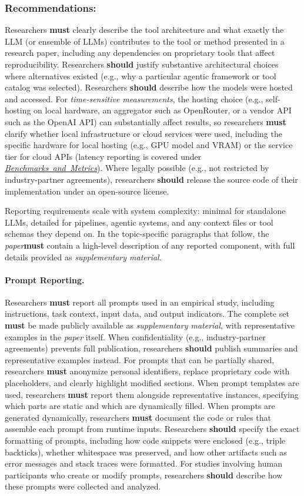 \documentclass[smallextended]{svjour3}
\newcommand{\must}{\textbf{must}\xspace}
\newcommand{\should}{\textbf{should}\xspace}
\newcommand{\paper}{\emph{paper}\xspace}
\newcommand{\supplementarymaterial}{\emph{supplementary material}\xspace}
\newcommand{\paper}{\emph{paper}\xspace}
\newcommand{\supplementarymaterial}{\emph{supplementary material}\xspace}
\newcommand{\benchmarksmetrics}{\hyperref[sec:use-suitable-baselines-benchmarks-and-metrics]{\mbox{\emph{Benchmarks and Metrics}}}\xspace}
\newcommand{\benchmarksmetrics}{\href{/guidelines/benchmarks-metrics/}{\emph{Benchmarks and Metrics}}\xspace}
\newcommand{\guidelinesubsubsection}[1]{\subsubsection{\bfseries #1:}}
\newcommand{\guidelineparagraph}[1]{\paragraph{#1.}}
\newcommand{\guidelinesubsubsection}[1]{\subsubsection{#1}}
\newcommand{\guidelineparagraph}[1]{\paragraph{#1}}
\begin{document}
\guidelinesubsubsection{Recommendations}

Researchers \must clearly describe the tool architecture and what exactly the LLM (or ensemble of LLMs) contributes to the tool or method presented in a research paper, including any dependencies on proprietary tools that affect reproducibility.
Researchers \should justify substantive architectural choices where alternatives existed (e.g., why a particular agentic framework or tool catalog was selected).
Researchers \should describe how the models were hosted and accessed. For \emph{time-sensitive measurements}, the hosting choice (e.g., self-hosting on local hardware, an aggregator such as OpenRouter, or a vendor API such as the OpenAI API) can substantially affect results, so researchers \must clarify whether local infrastructure or cloud services were used, including the specific hardware for local hosting (e.g., GPU model and VRAM) or the service tier for cloud APIs (latency reporting is covered under \benchmarksmetrics).
Where legally possible (e.g., not restricted by industry-partner agreements), researchers \should release the source code of their implementation under an open-source license.

Reporting requirements scale with system complexity: minimal for standalone LLMs, detailed for pipelines, agentic systems, and any context files or tool schemas they depend on. In the topic-specific paragraphs that follow, the \paper \must contain a high-level description of any reported component, with full details provided as \supplementarymaterial.

\guidelineparagraph{Prompt Reporting}
Researchers \must report all prompts used in an empirical study, including instructions, task context, input data, and output indicators.
The complete set \must be made publicly available as \supplementarymaterial, with representative examples in the \paper itself.
When confidentiality (e.g., industry-partner agreements) prevents full publication, researchers \should publish summaries and representative examples instead.
For prompts that can be partially shared, researchers \must anonymize personal identifiers, replace proprietary code with placeholders, and clearly highlight modified sections.
When prompt templates are used, researchers \must report them alongside representative instances, specifying which parts are static and which are dynamically filled.
When prompts are generated dynamically, researchers \must document the code or rules that assemble each prompt from runtime inputs.
Researchers \should specify the exact formatting of prompts, including how code snippets were enclosed (e.g., triple backticks), whether whitespace was preserved, and how other artifacts such as error messages and stack traces were formatted.
For studies involving human participants who create or modify prompts, researchers \should describe how these prompts were collected and analyzed.
\end{document}
